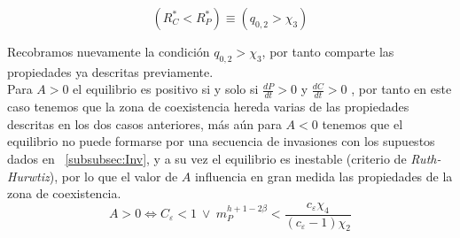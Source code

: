 \begin{equation}
  (R^*_C < R^*_P) \equiv (q_{0,2} > \chi_3)
\end{equation}

Recobramos nuevamente la condici\'on $q_{0,2} > \chi_3$, por tanto comparte las propiedades ya descritas previamente. \\


Para $A>0$ el equilibrio es positivo si y solo si $\frac{dP}{dt} >0 $ y $\frac{dC}{dt} >0$ , por tanto en este caso tenemos que la zona de coexistencia hereda varias de las propiedades descritas en los dos casos anteriores, m\'as a\'un para $A <0$ tenemos que el equilibrio no puede formarse por una secuencia de invasiones con los supuestos dados en ~\ref{subsubsec:Inv}, y a su vez el equilibrio es inestable (criterio de \emph{Ruth-Hurwtiz}\citep{holt1997theoretical}), por lo que el valor de $A$ influencia en gran medida las propiedades de la zona de coexistencia.\\


\begin{equation}
  A > 0 \iff C_\varepsilon < 1 \  \lor \  m_P^{h + 1 - 2\beta} < \frac{c_\varepsilon \chi_4}{(c_\varepsilon - 1) \chi_2}
\end{equation}

